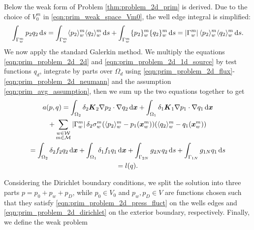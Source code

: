 Below the weak form of Problem \ref{thm:problem_2d_prim} is derived.
Due to the choice of $V^m_0$ in \eqref{eqn:prim_weak_space_Vm0},
the well edge integral is simplified:
\begin{equation} \label{eqn:prim_avg_assumption}
    \int_{\Gamma^m_w} p_2q_2 \dd s %
    =  \int_{\Gamma^m_w} \avg{p_2}^m_w\avg{q_2}^m_w \dd s + \int_{\Gamma^m_w} \fluct{p_2}^m_w\fluct{q_2}^m_w \dd s = \abs{\Gamma^m_w} \avg{p_2}^m_w\avg{q_2}^m_w \dd s.
\end{equation}
We now apply the standard Galerkin method. We multiply the equations \eqref{eqn:prim_problem_2d_2d} and \eqref{eqn:prim_problem_2d_1d_source}
by test functions $q_d$, integrate by parts over $\Omega_d$ using \eqref{eqn:prim_problem_2d_flux}-\eqref{eqn:prim_problem_2d_neumann} and the assumption \eqref{eqn:prim_avg_assumption}, 
then we sum up the two equations together to get
\begin{multline} \label{eqn:prim_weak_form}
  a(p,q) =
  \int_{\Omega_2} \delta_2 \mathbf{\boldsymbol{K}}_2 \nabla p_2 \cdot \nabla q_2 \,{\rm d}\mathbf{\boldsymbol{x}}
  + \int_{\Omega_1} \delta_1 \mathbf{\boldsymbol{K}}_1 \nabla p_1 \cdot \nabla q_1 \,{\rm d}\mathbf{\boldsymbol{x}} \\
  + \sum_{\substack{w\in \mathcal{W} \\ m\in \mathcal{M}}} \left|\Gamma^m_w\right| \delta_2 \sigma^m_w (\langle p_2\rangle^m_w - p_1(\mathbf{\boldsymbol{x}}^m_w)) (\langle q_2\rangle^m_w - q_1(\mathbf{\boldsymbol{x}}^m_w)) \\
  = \int_{\Omega_2} \delta_2 f_2 q_2 \,{\rm d}\mathbf{\boldsymbol{x}} + \int_{\Omega_1} \delta_1 f_1 q_1 \,{\rm d}\mathbf{\boldsymbol{x}}
  + \int_{\Gamma_{2N}} g_{2N}q_2 \,{\rm d} s + \int_{\Gamma_{1N}} g_{1N}q_1 \,{\rm d} s \\
  = l(q).
\end{multline}


Considering the Dirichlet boundary conditions, we split the solution into three parts $p=p_0 + p_w + p_D$, while
$p_0\in V_0$ and $p_w, p_D\in V$ are functions chosen such that they satisfy \eqref{eqn:prim_problem_2d_press_fluct} on the wells edges and
\eqref{eqn:prim_problem_2d_dirichlet} on the exterior boundary, respectively.
Finally, we define the weak problem


